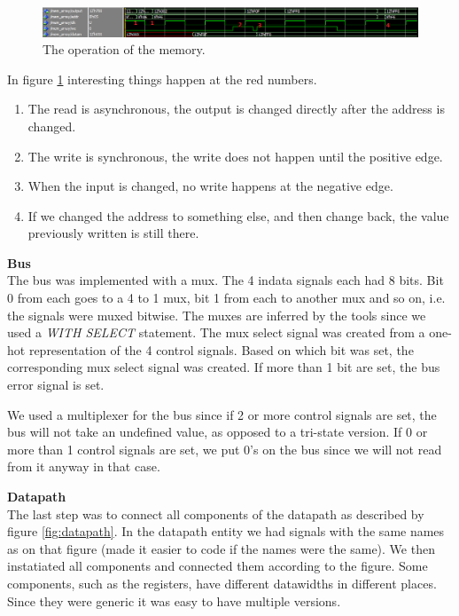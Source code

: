 \documentclass[a4paper,11pt]{article}
\begin{document}
\begin{figure}[h!]
  \centering
  \includegraphics[width=\linewidth]{inst_mem_2.PNG}
  \caption{The operation of the memory.}
  \label{fig:memory}
\end{figure}

In figure \ref{fig:memory} interesting things happen at the red numbers.

\begin{enumerate}
	\item The read is asynchronous, the output is changed directly after the address is changed.
	\item The write is synchronous, the write does not happen until the positive edge.
	\item When the input is changed, no write happens at the negative edge.
	\item If we changed the address to something else, and then change back, the value previously written is still there.
\end{enumerate}

\textbf{Bus}\\
The bus was implemented with a mux. The 4 indata signals each had 8 bits. Bit 0 from each goes to a 4 to 1 mux, bit 1 from each to another mux and so on, i.e. the signals were muxed bitwise. The muxes are inferred by the tools since we used a \textit{WITH SELECT} statement. The mux select signal was created from a one-hot representation of the 4 control signals. Based on which bit was set, the corresponding mux select signal was created. If more than 1 bit are set, the bus error signal is set.

We used a multiplexer for the bus since if 2 or more control signals are set, the bus will not take an undefined value, as opposed to a tri-state version. If 0 or more than 1 control signals are set, we put 0's on the bus since we will not read from it anyway in that case.

\textbf{Datapath}\\
The last step was to connect all components of the datapath as described by figure \ref{fig:datapath}. In the datapath entity we had signals with the same names as on that figure (made it easier to code if the names were the same). We then instatiated all components and connected them according to the figure. Some components, such as the registers, have different datawidths in different places. Since they were generic it was easy to have multiple versions.
\end{document}
